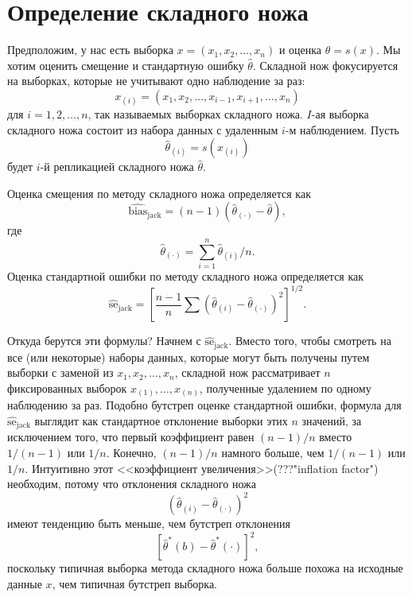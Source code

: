 \section{Определение складного ножа}

Предположим, у нас есть выборка $x = (x_1, x_2, \dots, x_n)$ и оценка $\hat{\theta} = s(x)$. Мы хотим оценить смещение и стандартную ошибку $\hat{\theta}$. Складной нож фокусируется на выборках, которые не учитывают одно наблюдение за раз:
\begin{equation}\label{eq11.1}
    x_{(i)} = (x_1, x_2, \dots, x_{i-1}, x_{i+1}, \dots, x_n)
\end{equation}
для $i = 1, 2, \dots, n$, так называемых выборках складного ножа. $I$-ая выборка складного ножа состоит из набора данных с удаленным $i$-м наблюдением. Пусть
\begin{equation}\label{eq11.2}
    \hat{\theta}_{(i)} = s(x_{(i)})
\end{equation}
будет $i$-й репликацией складного ножа $\hat{\theta}$.

Оценка смещения по методу складного ножа определяется как
\begin{equation}\label{eq11.3}
   \widehat{\text{bias}}_{\text{jack}} = (n-1)(\hat{\theta}_{(\cdot)} - \hat{\theta}),
\end{equation}
где
\begin{equation}\label{eq11.4}
   \hat{\theta}_{(\cdot)} = \sum\limits_{i=1}^{n}\hat{\theta}_{(i)}/n.
\end{equation}
Оценка стандартной ошибки по методу складного ножа определяется как
\begin{equation}\label{eq11.5}
   \widehat{\text{se}}_{\text{jack}} = \left[\frac{n-1}{n}\sum(\hat{\theta}_{(i)} - \hat{\theta}_{(\cdot)})^{2}\right]^{1/2}.
\end{equation}

Откуда берутся эти формулы? Начнем с $\widehat{\text{se}}_{\text{jack}}$. Вместо того, чтобы смотреть на все (или некоторые) наборы данных, которые могут быть получены путем выборки с заменой из $x_1, x_2, \dots, x_n$, складной нож рассматривает $n$ фиксированных выборок $x_{(1)}, \dots, x_{(n)}$, полученные удалением по одному наблюдению за раз. Подобно бутстреп оценке стандартной ошибки, формула для $\widehat{\text{se}}_{\text{jack}}$ выглядит как стандартное отклонение выборки этих $n$ значений, за исключением того, что первый коэффициент равен $(n-1)/n$ вместо $1/(n-1)$ или $1/n$. Конечно, $(n-1)/n$ намного больше, чем $1/(n-1)$ или $1/n$. Интуитивно этот <<коэффициент увеличения>>(???"inflation factor") необходим, потому что отклонения складного ножа
\begin{equation}\label{eq11.6}
   (\hat{\theta}_{(i)} - \hat{\theta}_{(\cdot)})^{2}
\end{equation}
имеют тенденцию быть меньше, чем бутстреп отклонения
\begin{equation}\label{eq11.7}
   [\hat{\theta}^{*}(b) - \hat{\theta}^{*}(\cdot)]^{2},
\end{equation}
поскольку типичная выборка метода складного ножа больше похожа на исходные данные $x$, чем типичная бутстреп выборка.

